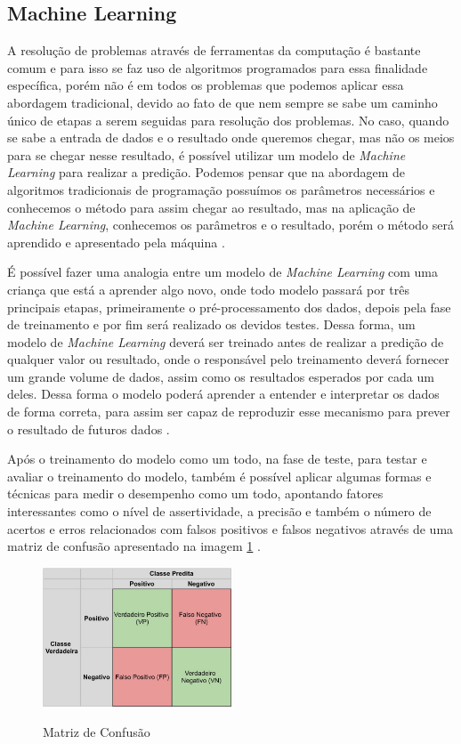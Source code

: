 \subsection{Machine Learning}

A resolução de problemas através de ferramentas da computação é bastante comum e para isso se faz uso de algoritmos programados para essa finalidade específica, porém não é em todos os problemas que podemos aplicar essa abordagem tradicional, devido ao fato de que nem sempre se sabe um caminho único de etapas a serem seguidas para resolução dos problemas. No caso, quando se sabe a entrada de dados e o resultado onde queremos chegar, mas não os meios para se chegar nesse resultado, é possível utilizar um modelo de \emph{Machine Learning} para realizar a predição. Podemos pensar que na abordagem de algoritmos tradicionais de programação possuímos os parâmetros necessários e conhecemos o método para assim chegar ao resultado, mas na aplicação de \emph{Machine Learning}, conhecemos os parâmetros e o resultado, porém o método será aprendido e apresentado pela máquina \cite{machineLearning}.

É possível fazer uma analogia entre um modelo de \emph{Machine Learning} com uma criança que está a aprender algo novo, onde todo modelo passará por três principais etapas, primeiramente o pré-processamento dos dados, depois pela fase de treinamento e por fim será realizado os devidos testes. Dessa forma, um modelo de \emph{Machine Learning} deverá ser treinado antes de realizar a predição de qualquer valor ou resultado, onde o responsável pelo treinamento deverá fornecer um grande volume de dados, assim como os resultados esperados por cada um deles. Dessa forma o modelo poderá aprender a entender e interpretar os dados de forma correta, para assim ser capaz de reproduzir esse mecanismo para prever o resultado de futuros dados \cite{machineLearningPython}.

Após o treinamento do modelo como um todo, na fase de teste, para testar e avaliar o treinamento do modelo, também é possível aplicar algumas formas e técnicas para medir o desempenho como um todo, apontando fatores interessantes como o nível de assertividade, a precisão e também o número de acertos e erros relacionados com falsos positivos e falsos negativos através de uma matriz de confusão apresentado na imagem \ref{fig:confusionMatrix} \cite{machineLearningTensorFlow}.

\begin{figure}[!htb]
	\centering
	\caption{Matriz de Confusão}
	\includegraphics[width=0.50\textwidth]{img/confusionMatrix.jpg}
	\label{fig:confusionMatrix}
\end{figure}

